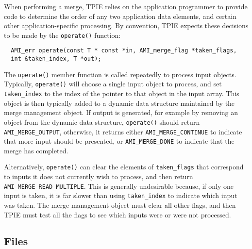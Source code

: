      When performing a merge, TPIE
    relies on the application programmer to provide code to determine
    the order of any two application data elements, and certain other
    application-specific processing. By convention, TPIE expects these
    decisions to be made by the \lstinline|operate()| function:
\begin{lstlisting}
  AMI_err operate(const T * const *in, AMI_merge_flag *taken_flags,
  int &taken_index, T *out);
\end{lstlisting}
The \lstinline|operate()| member function is called repeatedly to
process input objects.  Typically, \lstinline|operate()| will choose a
single input object to process, and set \lstinline|taken_index| to the
index of the pointer to that object in the input array.  This object
is then typically added to a dynamic data structure maintained by the
merge management object.  If output is generated, for example by
removing an object from the dynamic data structure,
\lstinline|operate()| should return \lstinline|AMI_MERGE_OUTPUT|,
otherwise, it returns either \lstinline|AMI_MERGE_CONTINUE| to
indicate that more input should be presented, or
\lstinline|AMI_MERGE_DONE| to indicate that the merge has completed.
    
Alternatively, \lstinline|operate()| can clear the elements of
\lstinline|taken_flags| that correspond to inputs it does not
currently wish to process, and then return
\lstinline|AMI_MERGE_READ_MULTIPLE|.  This is generally undesirable
because, if only one input is taken, it is far slower than using
\lstinline|taken_index| to indicate which input was taken.  The merge
management object must clear all other flags, and then TPIE must test
all the flags to see which inputs were or were not processed.






\subsection{Files}
  \btabb
     {}
  \etabb


